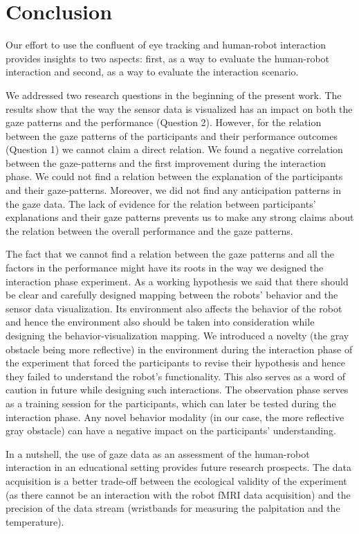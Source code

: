 \documentclass{sig-alternate}
\begin{document}
\section{Conclusion}

Our effort to use the confluent of eye tracking and human-robot
interaction provides insights to two aspects: first, as a way to
evaluate the human-robot interaction and second, as a way to evaluate
the interaction scenario.

We addressed two research questions in the beginning of the present
work. The results show that the way the sensor data is visualized has an
impact on both the gaze patterns and the performance (Question 2).
However, for the relation between the gaze patterns of the participants
and their performance outcomes (Question 1) we cannot claim a direct
relation. We found a negative correlation between the gaze-patterns and
the first improvement during the interaction phase. We could not find a
relation between the explanation of the participants and their
gaze-patterns. Moreover, we did not find any anticipation patterns in
the gaze data. The lack of evidence for the relation between
participants' explanations and their gaze patterns prevents us to make
any strong claims about the relation between the overall performance and
the gaze patterns.

The fact that we cannot find a relation between the gaze patterns and
all the factors in the performance might have its roots in the way we
designed the interaction phase experiment. As a working hypothesis we
said that there should be clear and carefully designed mapping between
the robots' behavior and the sensor data visualization. Its environment
also affects the behavior of the robot and hence the environment also
should be taken into consideration while designing the
behavior-visualization mapping. We introduced a novelty (the gray
obstacle being more reflective) in the environment during the
interaction phase of the experiment that forced the participants to
revise their hypothesis and hence they failed to understand the robot's
functionality. This also serves as a word of caution in future while
designing such interactions. The observation phase serves as a training
session for the participants, which can later be tested during the
interaction phase. Any novel behavior modality (in our case, the more
reflective gray obstacle) can have a negative impact on the
participants' understanding.

In a nutshell, the use of gaze data as an assessment of the human-robot
interaction in an educational setting provides future research
prospects. The data acquisition is a better trade-off between the
ecological validity of the experiment (as there cannot be an interaction
with the robot fMRI data acquisition) and the precision of the data
stream (wristbands for measuring the palpitation and the temperature).
\end{document}
